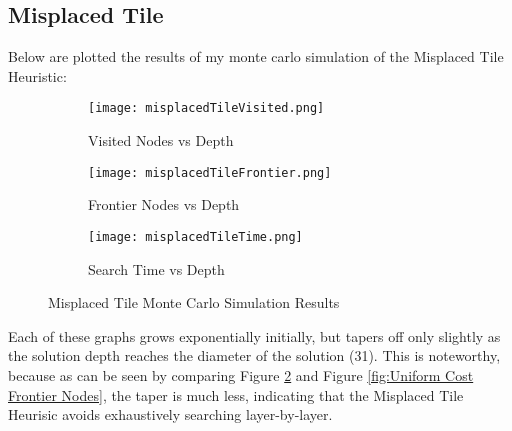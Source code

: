 \documentclass{article}
\begin{document}
\subsection{Misplaced Tile}
Below are plotted the results of my monte carlo simulation of the Misplaced Tile Heuristic:
\begin{figure}[h]
	\centering
	\begin{subfigure}[b]{0.32\textwidth}
		\centering
		\texttt{[image: misplacedTileVisited.png]}
		\caption{Visited Nodes vs Depth}
		\label{fig:Misplaced Tile Visited Nodes}
	\end{subfigure}
	\hfill
	\begin{subfigure}[b]{0.32\textwidth}
		\centering
		\texttt{[image: misplacedTileFrontier.png]}
		\caption{Frontier Nodes vs Depth}
		\label{fig:Misplaced Tile Frontier Nodes}
	\end{subfigure}
	\hfill
	\begin{subfigure}[b]{0.32\textwidth}
		\centering
		\texttt{[image: misplacedTileTime.png]}
		\caption{Search Time vs Depth}
		\label{fig:Misplaced Tile Search Time}
	\end{subfigure}
	\caption{Misplaced Tile Monte Carlo Simulation Results}
	\label{fig:Misplaced Tile Monte Carlo Simulation}
\end{figure}
\par Each of these graphs grows exponentially initially, but tapers off only slightly as the solution depth reaches the diameter of the solution (31). This is noteworthy, because as can be seen by comparing Figure \ref{fig:Misplaced Tile Frontier Nodes} and Figure \ref{fig:Uniform Cost Frontier Nodes}, the taper is much less, indicating that the Misplaced Tile Heurisic avoids exhaustively searching layer-by-layer.
\pagebreak
\end{document}
